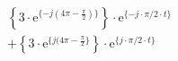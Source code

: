 \[
\begin{split}
&  \left \{ 3 \cdot \textrm{e}^{\{-j (4\pi-\frac{\pi}{2}) \}} \right \} \cdot \textrm{e}^{\{-j \cdot \pi/2 \cdot t \}} \\
&+ \left \{ 3 \cdot \textrm{e}^{\{j (4\pi-\frac{\pi}{2} \}} \right \} \cdot \textrm{e}^{\{j \cdot \pi/2 \cdot t \}}
\end{split}
\]
